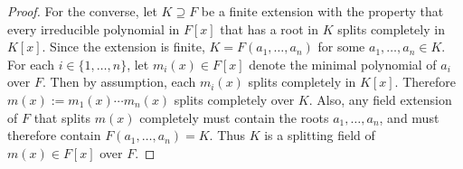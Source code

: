 \documentclass{article}
\begin{document}
\begin{proof}
    For the converse, let $K\supseteq F$ be a finite extension with the
    property that every irreducible polynomial in $F[x]$ that has a root in
    $K$ splits completely in $K[x]$. Since the extension is finite,
    $K=F(a_1,\ldots,a_n)$ for some $a_1,\ldots,a_n\in K$. For each
    $i\in\{1,\ldots,n\}$, let $m_i(x)\in F[x]$ denote the minimal
    polynomial of $a_i$ over $F$. Then by assumption, each $m_i(x)$ splits
    completely in $K[x]$. Therefore $m(x):=m_1(x)\cdots
    m_n(x)$ splits completely over $K$. Also, any field extension of $F$
    that splits $m(x)$ completely must contain the roots $a_1,\ldots,a_n$,
    and must therefore contain $F(a_1,\ldots,a_n)=K$. Thus $K$ is a
    splitting field of $m(x)\in F[x]$ over $F$.
  \end{proof}
\end{document}
